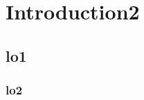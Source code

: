 \documentclass[12pt, letterpaper]{article}            %
\begin{document}
\section{Introduction2}
\lipsum[1-5]
\subsection{lo1}
\lipsum[1-4]
\subsubsection{lo2}
\lipsum[1-2]~\citep{articleExample}
\lipsum[3]



{}

\end{document}
